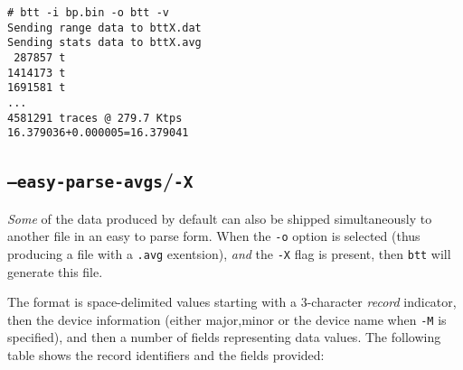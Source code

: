 \documentclass{article}
\begin{document}
\begin{verbatim}
# btt -i bp.bin -o btt -v
Sending range data to bttX.dat
Sending stats data to bttX.avg
 287857 t
1414173 t
1691581 t
...
4581291 traces @ 279.7 Ktps
16.379036+0.000005=16.379041
\end{verbatim}

\subsection{\label{sec:o-X}\texttt{--easy-parse-avgs}/\texttt{-X}}

  \emph{Some} of the data produced by default can also be shipped
  simultaneously to another file in an easy to parse form. When
  the \texttt{-o} option is selected (thus producing a file with a
  \texttt{.avg} exentsion), \emph{and} the \texttt{-X} flag is present,
  then \texttt{btt} will generate this file.

  The format is space-delimited values starting with a 3-character
  \emph{record} indicator, then the device information (either major,minor
  or the device name when \texttt{-M} is specified), and then a number of
  fields representing data values. The following table shows the record
  identifiers and the fields provided:
\end{document}
